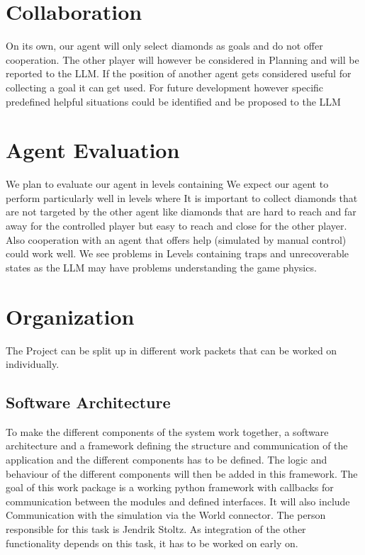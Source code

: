 \documentclass{article}
\begin{document}
\section{Collaboration}

On its own, our agent will only select diamonds as goals and do not offer cooperation. The other player will however be considered in Planning and will be reported to the LLM. If the position of another agent gets considered useful for collecting a goal it can get used. For future development however specific predefined helpful situations could be identified and be proposed to the LLM

\section{Agent Evaluation}

We plan to evaluate our agent in levels containing 
We expect our agent to perform particularly well in levels where It is important to collect diamonds that are not targeted by the other agent like diamonds that are hard to reach and far away for the controlled player but easy to reach and close for the other player. Also cooperation with an agent that offers help (simulated by manual control) could work well. We see problems in Levels containing traps and unrecoverable states as the LLM may have problems understanding the game physics.

\section{Organization}

The Project can be split up in different work packets that can be worked on individually.

\subsection{Software Architecture}
To make the different components of the system work together, a software architecture and a framework defining the structure and communication of the application and the different components has to be defined. The logic and behaviour of the different components will then be added in this framework. The goal of this work package is a working python framework with callbacks for communication between the modules and defined interfaces. It will also include Communication with the simulation via the World connector. The person responsible for this task is Jendrik Stoltz. As integration of the other functionality depends on this task, it has to be worked on early on.
\end{document}
